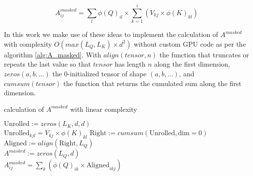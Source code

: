 \begin{equation}
A^{masked}_{ij}= \sum_l \phi(Q)_{il} \times \sum_{k=1}^i \left(V_{kj} \times \phi(K)_{kl} \right)
\end{equation}

In this work we make use of these ideas to implement the calculation of
 $A^{masked}$ with complexity $O(max(L_Q, L_K) \times d^2)$ without
 custom GPU code as per the algorithm \ref{alg:A_masked}. With $align(tensor, n)$ the function that truncates or repeats the last value so that $tensor$ has length $n$ along the first dimension, $zeros(a, b, ...)$ the 0-initialized tensor of shape $(a, b, ...)$, and $cumsum(tensor)$ the function that returns the cumulated sum along the first dimension.

\begin{algorithm}[H]
	\caption{calculation of $A^{masked}$ with linear complexity}
	\label{alg:A_masked}
	$\text{Unrolled} := zeros(L_K, d, d)$\\
	{
		{
			$\text{Unrolled}_{kjl} = V_{kj} \times \phi(K)_{kl}$
		}
	}
	$\text{Right} := cumsum\left(\text{Unrolled}, \text{dim}=0\right)$\\
	$\text{Aligned} := align(\text{Right}, L_Q)$\\
	$A^{masked} := zeros(L_Q, d)$\\
	{
		{
			$A^{masked}_{ij} = \sum_k \left( \phi(Q)_{ik} \times \text{Aligned}_{ikj} \right)$
		}
	}
\end{algorithm}
